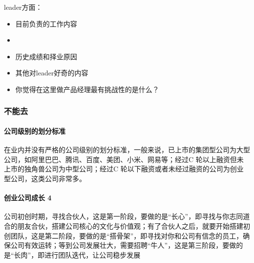 \documentclass[letterpaper,11pt,english]{sphinxmanual}
\begin{document}
leader方面：
\begin{itemize}
\item {} 
目前负责的工作内容

\item {} 

\item {} 
历史成绩和择业原因

\item {} 
其他对leader好奇的内容

\item {} 
你觉得在这里做产品经理最有挑战性的是什么？%
\begin{footnote}[809]\sphinxAtStartFootnote
{}
%
\end{footnote}

\end{itemize}


\subsubsection{不能去}
\label{\detokenize{chapter_interview/not_go:id1}}\label{\detokenize{chapter_interview/not_go::doc}}

\paragraph{公司级别的划分标准}
\label{\detokenize{chapter_interview/not_go:id2}}
在业内并没有严格的公司级别的划分标准，一般来说，已上市的集团型公司为大型公司，如阿里巴巴、腾讯、百度、美团、小米、网易等；经过C
轮以上融资但未上市的独角兽公司为中型公司；经过C
轮以下融资或者未经过融资的公司为创业型公司，这类公司非常多。


\paragraph{创业公司成长 4\sphinxfootnotemark[810]}
\label{\detokenize{chapter_interview/not_go:id3}}%
\begin{footnotetext}[810]\sphinxAtStartFootnote
{}
%
\end{footnotetext}\ignorespaces 
公司初创时期，寻找合伙人，这是第一阶段，要做的是“长心”，即寻找与你志同道合的朋友合伙，搭建公司核心的文化与价值观；有了合伙人之后，就要开始搭建初创团队，这是第二阶段，要做的是“搭骨架”，即寻找对你和公司有信念的员工，确保公司有效运转；等到公司发展壮大，需要招聘“牛人”，这是第三阶段，要做的是“长肉”，即进行团队迭代，让公司稳步发展
\end{document}
